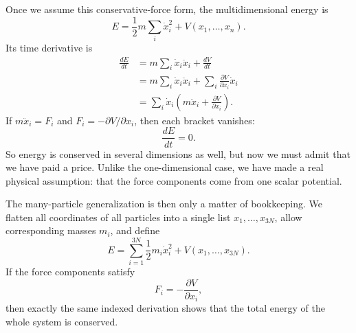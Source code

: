 \begin{figure}
\centering
{}
\end{figure}

Once we assume this conservative-force form, the multidimensional energy is
\begin{equation}
E=\frac12 m\sum_i \dot x_i^2+V(x_1,\dots,x_n).
\end{equation}
Its time derivative is
\begin{align}
\frac{dE}{dt}
&=m\sum_i \dot x_i\ddot x_i+\frac{dV}{dt}\\
&=m\sum_i \dot x_i\ddot x_i+\sum_i\frac{\partial V}{\partial x_i}\dot x_i\\
&=\sum_i \dot x_i\left(m\ddot x_i+\frac{\partial V}{\partial x_i}\right).
\end{align}
If \(m\ddot x_i=F_i\) and \(F_i=-\partial V/\partial x_i\), then each bracket vanishes:
\begin{equation}
\frac{dE}{dt}=0.
\end{equation}
So energy is conserved in several dimensions as well, but now we must admit that we have paid a price. Unlike the one-dimensional case, we have made a real physical assumption: that the force components come from one scalar potential.

The many-particle generalization is then only a matter of bookkeeping. We flatten all coordinates of all particles into a single list \(x_1,\dots,x_{3N}\), allow corresponding masses \(m_i\), and define
\begin{equation}
E=\sum_{i=1}^{3N}\frac12 m_i\dot x_i^2+V(x_1,\dots,x_{3N}).
\end{equation}
If the force components satisfy
\begin{equation}
F_i=-\frac{\partial V}{\partial x_i},
\end{equation}
then exactly the same indexed derivation shows that the total energy of the whole system is conserved.

